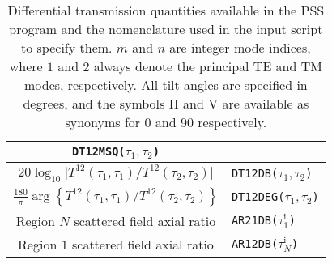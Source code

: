 \documentclass[11pt]{article}
\renewcommand{\inc}{^{\text{i}}}
\renewcommand{\abs}[1]{\bigl\lvert#1\bigr\rvert}
\begin{document}
\begin{table}[h]
\begin{center}
\begin{tabular}{|c|l|}
        \verb_DT12MSQ(_$\tau_1,\tau_2$\verb_)_ \\ \hline
      $20\log_{10}\abs{T^{12}(\tau_1,\tau_1) / 
        T^{12}(\tau_2,\tau_2)}$ & 
        \verb_DT12DB(_$\tau_1,\tau_2$\verb_)_ \\ \hline
      $\frac{180}{\pi}\arg\left\{T^{12}(\tau_1,\tau_1) / 
        T^{12}(\tau_2,\tau_2)\right\}$ & 
        \verb_DT12DEG(_$\tau_1,\tau_2$\verb_)_ \\ \hline
        Region $N$ scattered field axial ratio & 
        \verb_AR21DB(_$\tau_1\inc$\verb_)_ \\ \hline
        Region $1$ scattered field axial ratio & 
        \verb_AR12DB(_$\tau_N\inc$\verb_)_ \\ \hline
    \end{tabular}
    \caption[Differential transmission quantities available in the PSS
      program]%
    {Differential transmission quantities available in the PSS program
       and the nomenclature used in the input script to specify them. 
       $m$ and $n$ are integer mode indices, where $1$ and $2$ always
       denote the principal TE and TM modes, respectively. All
       tilt angles are specified in degrees, and the symbols
       \textsf{H} and \textsf{V} are available as synonyms
      for \textsf{0}  and \textsf{90} respectively.} 
    \label{tab:dtrans}
  \end{center}
\end{table}

\cleardoublepage
\newpage




%

\end{document}
